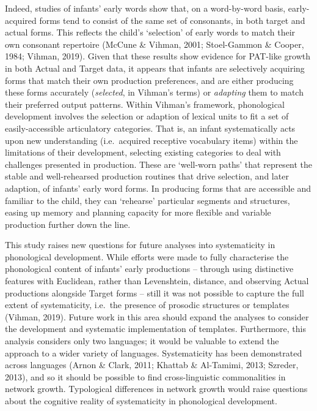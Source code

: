 \documentclass[
  man,mask,floatsintext]{apa6}
\begin{document}
Indeed, studies of infants' early words show that, on a word-by-word basis, early-acquired forms tend to consist of the same set of consonants, in both target and actual forms. This reflects the child's `selection' of early words to match their own consonant repertoire (McCune \& Vihman, 2001; Stoel-Gammon \& Cooper, 1984; Vihman, 2019). Given that these results show evidence for PAT-like growth in both Actual and Target data, it appears that infants are selectively acquiring forms that match their own production preferences, and are either producing these forms accurately (\emph{selected}, in Vihman's terms) or \emph{adapting} them to match their preferred output patterns. Within Vihman's framework, phonological development involves the selection or adaption of lexical units to fit a set of easily-accessible articulatory categories. That is, an infant systematically acts upon new understanding (i.e.~acquired receptive vocabulary items) within the limitations of their development, selecting existing categories to deal with challenges presented in production. These are `well-worn paths' that represent the stable and well-rehearsed production routines that drive selection, and later adaption, of infants' early word forms. In producing forms that are accessible and familiar to the child, they can `rehearse' particular segments and structures, easing up memory and planning capacity for more flexible and variable production further down the line.

This study raises new questions for future analyses into systematicity in phonological development. While efforts were made to fully characterise the phonological content of infants' early productions -- through using distinctive features with Euclidean, rather than Levenshtein, distance, and observing Actual productions alongside Target forms -- still it was not possible to capture the full extent of systematicity, i.e.~the presence of prosodic structures or templates (Vihman, 2019). Future work in this area should expand the analyses to consider the development and systematic implementation of templates. Furthermore, this analysis considers only two languages; it would be valuable to extend the approach to a wider variety of languages. Systematicity has been demonstrated across languages (Arnon \& Clark, 2011; Khattab \& Al-Tamimi, 2013; Szreder, 2013), and so it should be possible to find cross-linguistic commonalities in network growth. Typological differences in network growth would raise questions about the cognitive reality of systematicity in phonological development.
\end{document}
